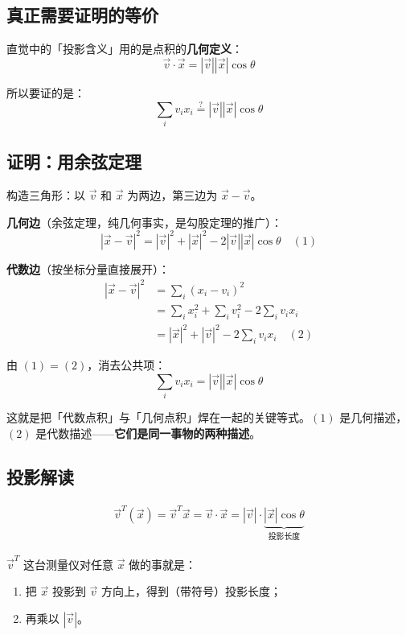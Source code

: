 \documentclass[11pt,a4paper]{article}
\begin{document}
\subsection{真正需要证明的等价}

直觉中的「投影含义」用的是点积的\textbf{几何定义}：
$$\vec{v} \cdot \vec{x} = |\vec{v}||\vec{x}|\cos\theta$$

所以要证的是：
$$\sum_i v_i x_i \overset{?}{=} |\vec{v}||\vec{x}|\cos\theta$$

\subsection{证明：用余弦定理}

构造三角形：以 $\vec{v}$ 和 $\vec{x}$ 为两边，第三边为 $\vec{x} - \vec{v}$。

\textbf{几何边}（余弦定理，纯几何事实，是勾股定理的推广）：
$$|\vec{x} - \vec{v}|^2 = |\vec{v}|^2 + |\vec{x}|^2 - 2|\vec{v}||\vec{x}|\cos\theta \quad (1)$$

\textbf{代数边}（按坐标分量直接展开）：
\begin{align*}
    |\vec{x} - \vec{v}|^2 & = \sum_i (x_i - v_i)^2                                   \\
                          & = \sum_i x_i^2 + \sum_i v_i^2 - 2\sum_i v_i x_i          \\
                          & = |\vec{x}|^2 + |\vec{v}|^2 - 2 \sum_i v_i x_i \quad (2)
\end{align*}

由 $(1) = (2)$，消去公共项：
$$\boxed{\sum_i v_i x_i = |\vec{v}||\vec{x}|\cos\theta}$$

\begin{insight}
    这就是把「代数点积」与「几何点积」焊在一起的关键等式。$(1)$ 是几何描述，$(2)$ 是代数描述——\textbf{它们是同一事物的两种描述}。
\end{insight}

\subsection{投影解读}

\begin{align*}
    \vec{v}^T(\vec{x}) = \vec{v}^T \vec{x} = \vec{v} \cdot \vec{x} = |\vec{v}| \cdot \underbrace{|\vec{x}|\cos\theta}_{\text{投影长度}}
\end{align*}

$\vec{v}^T$ 这台测量仪对任意 $\vec{x}$ 做的事就是：
\begin{enumerate}
    \item 把 $\vec{x}$ 投影到 $\vec{v}$ 方向上，得到（带符号）投影长度；
    \item 再乘以 $|\vec{v}|$。
\end{enumerate}
\end{document}
